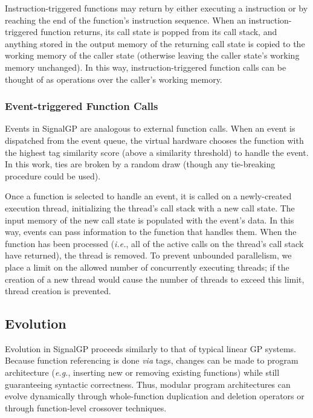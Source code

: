 Instruction-triggered functions may return by either executing a  instruction or by reaching the end of the function's instruction sequence. 
When an instruction-triggered function returns, its call state is popped from its call stack, and anything stored in the output memory of the returning call state is copied to the working memory of the caller state (otherwise leaving the caller state's working memory unchanged). 
In this way, instruction-triggered function calls can be thought of as operations over the caller's working memory. 

\subsubsection{Event-triggered Function Calls}

Events in SignalGP are analogous to external function calls. 
When an event is dispatched from the event queue, the virtual hardware chooses the function with the highest tag similarity score (above a similarity threshold) to handle the event.
In this work, ties are broken by a random draw (though any tie-breaking procedure could be used). 

Once a function is selected to handle an event, it is called on a newly-created execution thread, initializing the thread's call stack with a new call state. 
The input memory of the new call state is populated with the event's data. 
In this way, events can pass information to the function that handles them. 
When the function has been processed (\textit{i.e.}, all of the active calls on the thread's call stack have returned), the thread is removed. 
To prevent unbounded parallelism, we place a limit on the allowed number of concurrently executing threads; if the creation of a new thread would cause the number of threads to exceed this limit, thread creation is prevented.

\subsection{Evolution}
\label{chapter:signalgp:sec:signalgp:evolution}

Evolution in SignalGP proceeds similarly to that of typical linear GP systems. 
Because function referencing is done \textit{via} tags, changes can be made to program architecture (\textit{e.g.}, inserting new or removing existing functions) while still guaranteeing syntactic correctness. 
Thus, modular program architectures can evolve dynamically through whole-function duplication and deletion operators or through function-level crossover techniques. 

